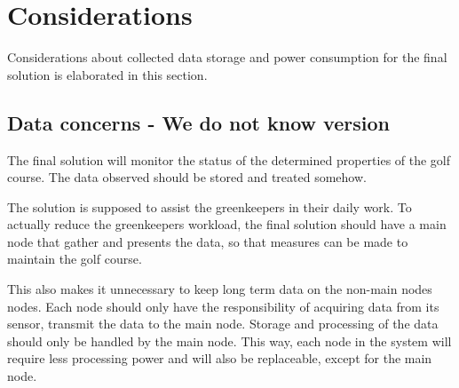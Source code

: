 \section{Considerations}
Considerations about collected data storage and power consumption for the final solution is elaborated in this section.

\subsection*{Data concerns - We do not know version}
The final solution will monitor the status of the determined properties of the golf course. The data observed should be stored and treated somehow.

The solution is supposed to assist the greenkeepers in their daily work. To actually reduce the greenkeepers workload, the final solution should have a main node that gather and presents the data, so that measures can be made to maintain the golf course.


This also makes it unnecessary to keep long term data on the non-main nodes nodes. 
Each node should only have the responsibility of acquiring data from its sensor, transmit the data to the main node. 
Storage and processing of the data should only be handled by the main node. 
This way, each node in the system will require less processing power and will also be replaceable, except for the main node.




